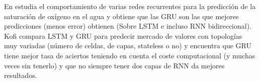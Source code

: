 En\cite{Qin2019} estudia el comportamiento de varias redes recurrentes para la predicción de la saturación de oxígeno en el agua y obtiene que las GRU son las que mejores predicciones (menos error) obtienen (Sobre LSTM e incluso RNN bidireccional). Kofi \cite{Koffi2020} compara LSTM y GRU para predecir mercado de valores con topologías muy variadas (número de celdas, de capas, stateless o no) y encuentra que GRU tiene mejor tasa de aciertos teniendo en cuenta el coste computacional (y muchas veces sin tenerlo) y que no siempre tener dos capas de RNN da mejores resultados.
\fi

